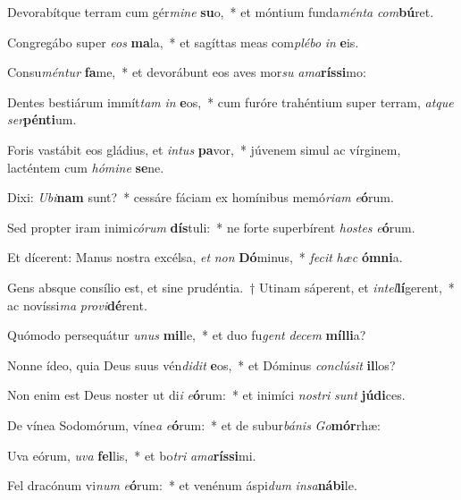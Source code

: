 \item Devorabítque terram cum gér\textit{mi}\textit{ne} \textbf{su}o,~* et móntium funda\textit{mén}\textit{ta} \textit{com}\textbf{bú}ret.
\item Congregábo super \textit{e}\textit{os} \textbf{ma}la,~* et sagíttas meas com\textit{plé}\textit{bo} \textit{in} \textbf{e}is.
\item Consu\textit{mén}\textit{tur} \textbf{fa}me,~* et devorábunt eos aves mor\textit{su} \textit{a}\textit{ma}\textbf{rís}\textbf{si}mo:
\item Dentes bestiárum immít\textit{tam} \textit{in} \textbf{e}os,~* cum furóre trahéntium super terram, \textit{at}\textit{que} \textit{ser}\textbf{pén}\textbf{ti}um.
\item Foris vastábit eos gládius, et \textit{in}\textit{tus} \textbf{pa}vor,~* júvenem simul ac vírginem, lacténtem cum \textit{hó}\textit{mi}\textit{ne} \textbf{se}ne.
\item Dixi: \textit{U}\textit{bi}\textbf{nam} sunt?~* cessáre fáciam ex homínibus memó\textit{ri}\textit{am} \textit{e}\textbf{ó}rum.
\item Sed propter iram inimi\textit{có}\textit{rum} \textbf{dís}tuli:~* ne forte superbírent \textit{hos}\textit{tes} \textit{e}\textbf{ó}rum.
\item Et dícerent: Manus nostra excélsa, \textit{et} \textit{non} \textbf{Dó}minus,~* \textit{fe}\textit{cit} \textit{hæc} \textbf{óm}\textbf{ni}a.
\item Gens absque consílio est, et sine prudéntia.~† Utinam sáperent, et \textit{in}\textit{tel}\textbf{lí}gerent,~* ac novíssi\textit{ma} \textit{pro}\textit{vi}\textbf{dé}rent.
\item Quómodo persequátur \textit{u}\textit{nus} \textbf{mil}le,~* et duo fu\textit{gent} \textit{de}\textit{cem} \textbf{míl}\textbf{li}a?
\item Nonne ídeo, quia Deus suus vén\textit{di}\textit{dit} \textbf{e}os,~* et Dóminus \textit{con}\textit{clú}\textit{sit} \textbf{il}los?
\item Non enim est Deus noster ut di\textit{i} \textit{e}\textbf{ó}rum:~* et inimíci \textit{nos}\textit{tri} \textit{sunt} \textbf{jú}\textbf{di}ces.
\item De vínea Sodomórum, víne\textit{a} \textit{e}\textbf{ó}rum:~* et de subur\textit{bá}\textit{nis} \textit{Go}\textbf{mór}rhæ:
\item Uva eórum, \textit{u}\textit{va} \textbf{fel}lis,~* et bo\textit{tri} \textit{a}\textit{ma}\textbf{rís}\textbf{si}mi.
\item Fel dracónum vi\textit{num} \textit{e}\textbf{ó}rum:~* et venénum áspi\textit{dum} \textit{in}\textit{sa}\textbf{ná}\textbf{bi}le.
